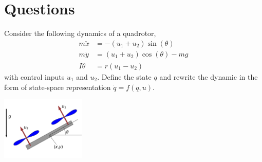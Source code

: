 \section{Questions}

\begin{problem}[10]
    Consider the following dynamics of a quadrotor, 
    \begin{align*}
        m \ddot{x} &= - (u_1+u_2) \sin{(\theta)} \\
        m \ddot{y} &= (u_1+u_2)\cos{(\theta)}-mg \\
        I \ddot{\theta} &= r(u_1-u_2)
    \end{align*}
     with control inputs $u_1$ and $u_2$.
     Define the state $q$ and 
     rewrite the dynamic in the form of state-space representation $\dot{q}=f(q,u)$.
    \begin{center}
        \includegraphics[width=0.3\textwidth]{quadrotor.png}
    \end{center}
\end{problem}

